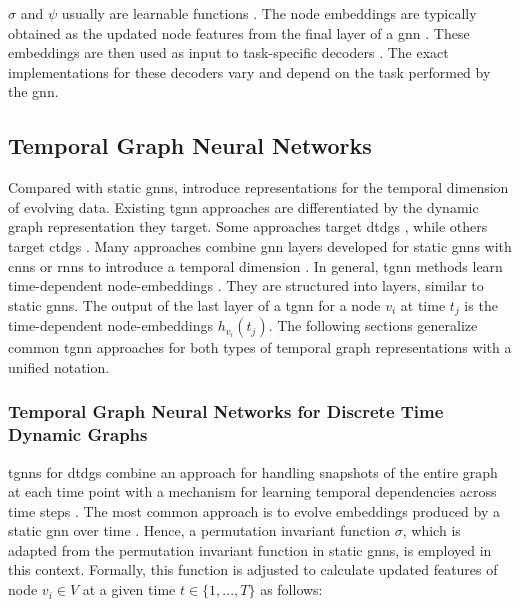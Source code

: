 $\sigma$ and $\psi$ usually are learnable functions \cite{bronstein_geometric_2021}. The node embeddings are typically obtained as the updated node features from the final layer of a \gls{gnn} \cite{hamilton_representation_2017}. These embeddings are then used as input to task-specific decoders \cite{hamilton_representation_2017}. The exact implementations for these decoders vary and depend on the task performed by the \gls{gnn}.

\subsection{Temporal Graph Neural Networks}
\label{s_Background_TGNNs}

Compared with static \glspl{gnn},  introduce representations for the temporal dimension of evolving data. Existing \gls{tgnn} approaches are differentiated by the dynamic graph representation they target. Some approaches target \glspl{dtdg} \cite{sankar_dysat_2020, manessi_dynamic_2020, you_roland_2022}, while others target \glspl{ctdg} \cite{rossi_temporal_2020, souza_provably_2022, ma_streaming_2018}.
Many approaches combine \gls{gnn} layers developed for static \glspl{gnn} with \glspl{cnn} or \glspl{rnn} to introduce a temporal dimension \cite{wu_comprehensive_2021}. In general, \gls{tgnn} methods learn time-dependent node-embeddings \cite{longa_graph_2023}. They are structured into layers, similar to static \glspl{gnn}. The output of the last layer of a \gls{tgnn} for a node $v_i$ at time $t_j$ is the time-dependent node-embeddings $h_{v_i}(t_j)$.
The following sections generalize common \gls{tgnn} approaches for both types of temporal graph representations with a unified notation.

\subsubsection{Temporal Graph Neural Networks for Discrete Time Dynamic Graphs}
\label{s_tgnns_for_dtdgs}
\glspl{tgnn} for \glspl{dtdg} combine an approach for handling snapshots of the entire graph at each time point with a mechanism for learning temporal dependencies across time steps \cite{longa_graph_2023}. The most common approach is to evolve embeddings produced by a static \gls{gnn} over time \cite{longa_graph_2023}. Hence, a permutation invariant function $\sigma$, which is adapted from the permutation invariant function in static \glspl{gnn}, is employed in this context. Formally, this function is adjusted to calculate updated features of node $v_i \in V$ at a given time $t \in \{1,...,T\}$ as follows:

